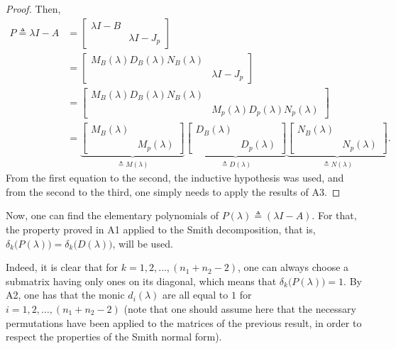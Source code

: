 \documentclass[11pt]{article}
\begin{document}
\begin{proof}
Then, 
\begin{align*}
P \triangleq \lambda I - A &= \begin{bmatrix}
\lambda I - B & \\
& \lambda I - J_p 
\end{bmatrix}\\
&= \begin{bmatrix}
M_{B}(\lambda) D_{B}(\lambda) N_{B}(\lambda) & \\
& \lambda I - J_p
\end{bmatrix}\\
&= \begin{bmatrix}
M_{B}(\lambda) D_{B}(\lambda) N_{B}(\lambda) & \\
& M_{p}(\lambda) D_{p}(\lambda) N_{p}(\lambda)
\end{bmatrix}\\
&= \underbrace{\begin{bmatrix}
M_{B}(\lambda) & \\
& M_{p}(\lambda)
\end{bmatrix}}_{\triangleq M(\lambda)}\underbrace{\begin{bmatrix}
D_{B}(\lambda) & \\
& D_{p}(\lambda)
\end{bmatrix}}_{\triangleq D(\lambda)}\underbrace{\begin{bmatrix}
N_{B}(\lambda) & \\
& N_{p}(\lambda)
\end{bmatrix}}_{\triangleq N(\lambda)}.
\end{align*}
From the first equation to the second, the inductive hypothesis was used, and from the second to the third, one simply needs to apply the results of A3.
\end{proof}

Now, one can find the elementary polynomials of $P(\lambda) \triangleq (\lambda I - A)$. For that, the property proved in A1 applied to the Smith decomposition, that is, $\delta_k\big(P(\lambda)\big) = \delta_k\big(D(\lambda)\big)$, will be used.

Indeed, it is clear that for $k = 1, 2, \dots, (n_1 + n_2 - 2)$, one can always choose a submatrix having only ones on its diagonal, which means that $\delta_k\big(P(\lambda)\big) = 1$.
By A2, one has that the monic $d_i(\lambda)$ are all equal to \(1\) for $i = 1, 2, \dots, (n_1 + n_2 - 2)$ (note that one should assume here that the necessary permutations have been applied to the matrices of the previous result, in order to respect the properties of the Smith normal form).
\end{document}
